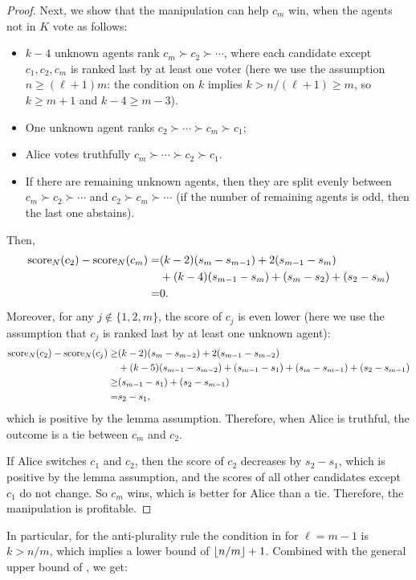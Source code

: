 \begin{proof}
Next, we show that the manipulation can help $c_m$ win, when the agents not in $K$ vote as follows:
\begin{itemize}
\item $k-4$ unknown agents rank $c_m\succ c_2\succ \cdots $,
where each candidate except $c_1,c_2,c_m$ is ranked last by at least one voter (here we use the assumption $n\geq (\ell+1)m$: the condition on $k$ implies $k>n/(\ell+1)\geq m$, so $k\geq m+1$ and $k-4\geq m-3$).
\item One unknown agent ranks 
$c_2\succ \cdots \succ c_m \succ c_1$;
\item Alice votes truthfully $c_m\succ  \cdots \succ c_2 \succ c_1$.  
\item If there are remaining unknown agents, then they are split evenly between 
$c_m\succ c_2\succ \cdots $ and 
$c_2\succ c_m\succ \cdots $ (if the number of remaining agents is odd, then the last one abstains).
\end{itemize}
Then,
\begin{align*}
\operatorname{score}_N(c_2) - \operatorname{score}_N(c_m)
=&
(k-2)(s_{m}-s_{m-1}) 
+ 2(s_{m-1}-s_{m})
\\
&+
(k-4)(s_{m-1}-s_{m}) 
+ (s_m-s_2)
+ (s_2-s_m)
\\
=&
0.
\end{align*}
Moreover, for any $j\not\in\{1,2,m\}$, the score of $c_j$ is even lower (here we use the assumption that $c_j$ is ranked last by at least one unknown agent):
\begin{align*}
\operatorname{score}_N(c_2) - \operatorname{score}_N(c_j)
\geq &
(k-2)(s_{m}-s_{m-2}) 
+ 2(s_{m-1}-s_{m-2})
\\
&+
(k-5)(s_{m-1}-s_{m-2}) 
+ (s_{m-1}-s_1)
+ (s_m-s_{m-1})
+ (s_2-s_{m-1})
\\
\geq & (s_{m-1}-s_{1})
+ (s_2-s_{m-1})
\\
= & s_2 - s_1,
\end{align*}
which is positive by the lemma assumption.
Therefore, when Alice is truthful, the outcome is a tie between $c_m$ and $c_2$.

If Alice switches $c_1$ and $c_2$, then the score of $c_2$ decreases by $s_2-s_1$, which is positive by the lemma assumption, and the scores of all other candidates except $c_1$ do not change. So $c_m$ wins, which is better for Alice than a tie.
Therefore, the manipulation is profitable.
\end{proof}

In particular, for the anti-plurality rule the condition in  for $\ell=m-1$ is $k>n/m$, which implies a lower bound of $\left\lfloor n/m \right\rfloor+1$. 
Combined with the general upper bound of , we get:

